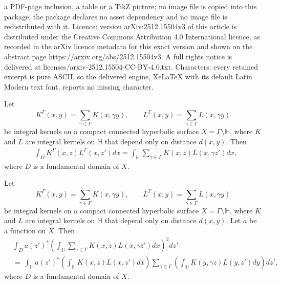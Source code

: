 \documentclass[10pt,a4paper]{amsart}
\begin{document}
a PDF-page inclusion, a table or a TikZ picture; no image file is copied into this package, the package declares no asset dependency and no image file is redistributed with it. Licence: version arXiv:2512.15504v3 of this article is distributed under the Creative Commons Attribution 4.0 International licence, as recorded in the arXiv licence metadata for this exact version and shown on the abstract page https://arxiv.org/abs/2512.15504v3. A full rights notice is delivered at licenses/arxiv-2512.15504-CC-BY-4.0.txt. Characters: every retained excerpt is pure ASCII, so the delivered engine, XeLaTeX with its default Latin Modern text font, reports no missing character.
\begin{lemma}[]
	\label{Lmm: Eliminate sum 1}
	Let 
	$$ K^{\Gamma}( x,y ) = \sum_{\gamma \in \Gamma}^{} K( x, \gamma y ), \qquad L^{\Gamma}( x,y ) = \sum_{\gamma \in \Gamma}^{} L( x, \gamma y ) $$ 
	be integral kernels on a compact connected hyperbolic surface $ X= \Gamma \setminus \mathbb{H} $, where $ K $ and $ L $ are integral kernels on $ \mathbb{H} $ that depend only on distance $ d( x,y ) $. Then
	\begin{align*}
		&
		\int_{D} K^{\Gamma}( x,z ) L^{\Gamma}( x,z' ) dx = \int_{\mathbb{H}}  \sum_{\gamma \in \Gamma}^{} K(  x, z ) L( x, \gamma z' ) dx,
	\end{align*}
	where $ D $ is a fundamental domain of $ X $.
\end{lemma}

\begin{lemma}[]
	\label{Lmm: Eliminate sum 2}
	Let 
	$$ K^{\Gamma}( x,y ) = \sum_{\gamma \in \Gamma}^{} K( x, \gamma y ), \qquad L^{\Gamma}( x,y ) = \sum_{\gamma \in \Gamma}^{} L( x, \gamma y ) $$ 
	be integral kernels on a compact connected hyperbolic surface $ X= \Gamma \setminus \mathbb{H} $, where $ K $ and $ L $ are integral kernels on $ \mathbb{H} $ that depend only on distance $ d( x,y ) $. Let $ a $ be a function on $ X $. Then
	\begin{align*}
		&
		\int_{D}  a( z' )^{*} \left( \int_{\mathbb{H}} \sum_{\gamma \in \Gamma}^{}K( x,z ) L( x, \gamma z' ) dx \right)^{2}  dz'
		\\
		& = \
		\int_{\mathbb{H}} a( z' )^{*}  \left( \int_{\mathbb{H}} K( x,z ) L( x, z' ) dx \right) \sum_{\gamma \in \Gamma}^{}  \left( \int_{\mathbb{H}} K( y,\gamma z ) L( y, z' ) dy \right) dz',
	\end{align*}
	where $ D $ is a fundamental domain of $ X $.
\end{lemma}
\end{document}
